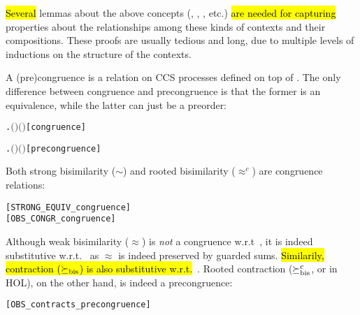 \hl{Several}
lemmas about the above concepts (, ,
, etc.) \hl{are needed for capturing} properties about
 the relationships among these kinds of contexts and their
 compositions. These proofs are usually tedious and long,  due to multiple levels of
 inductions on the structure of the contexts.

A (pre)congruence is a relation on CCS processes defined on top of
. The only difference between congruence and
precongruence is that the former is an equivalence,
while the latter can just be a preorder:
\begin{alltt}
     \HOLTokenDefEquality{}
       \HOLSymConst{\HOLTokenConj{}} \HOLSymConst{\HOLTokenForall{}}  .   \HOLSymConst{\HOLTokenImp{}}    \HOLSymConst{\HOLTokenImp{}}  \ensuremath{(} \ensuremath{)} \ensuremath{(} \ensuremath{)}\hfill{[congruence]}

     \HOLTokenDefEquality{}
       \HOLSymConst{\HOLTokenConj{}} \HOLSymConst{\HOLTokenForall{}}  .   \HOLSymConst{\HOLTokenImp{}}    \HOLSymConst{\HOLTokenImp{}}  \ensuremath{(} \ensuremath{)} \ensuremath{(} \ensuremath{)}\hfill{[precongruence]}
\end{alltt}

Both strong bisimilarity ($\sim$) and
rooted bisimilarity ($\approx^c$) are congruence relations:
\begin{alltt}
\HOLTokenTurnstile{}  \hfill{[STRONG_EQUIV_congruence]}
\HOLTokenTurnstile{}  \hfill{[OBS_CONGR_congruence]}
\end{alltt}

Although weak bisimilarity ($\approx$) is \emph{not} a congruence
  w.r.t~, it is indeed substitutive w.r.t.~ 
as $\approx$ is indeed preserved by guarded sums. \hl{Similarily,
contraction ($\mathrel{\succeq_{\rm{bis}}}$) is also substitutive w.r.t.}~.
%
Rooted contraction ($\mathrel{\succeq^{\rm{c}}_{\rm{bis}}}$, or  in HOL), on
the other hand, is indeed a precongruence:
\begin{alltt}
\HOLTokenTurnstile{}  \hfill{[OBS_contracts_precongruence]}
\end{alltt}

  